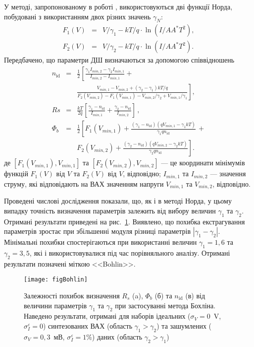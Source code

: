 У методі, запропонованому в роботі \cite{Bohlin}, використовуються дві функції Норда, побудовані з використанням двох різних значень $\gamma_N$:
\begin{eqnarray}
\label{eqBohlin}
F_1(V)&=&V/\gamma_1-kT/q\cdot\ln(I/AA^*T^2),
\nonumber\\
F_2(V)&=&V/\gamma_2-kT/q\cdot\ln(I/AA^*T^2).
\end{eqnarray}
Передбачено, що параметри ДШ визначаються за допомогою співвідношень
\begin{eqnarray}
\label{eqBohlinDet}
n_\mathrm{id}&=&\frac{1}{2}\left[\frac{\gamma_1I_{min,2}-\gamma_2I_{min,1}}{I_{min,2}-I_{min,1}}+\right.
\\
&&\left.\frac{V_{min,1}-V_{min,2}+(\gamma_2-\gamma_1)kT/q}{F_2(V_{min,2})-F_1(V_{min,1})-V_{min,2}/\gamma_2+V_{min,1}/\gamma_1}\right]
,\nonumber
\\
Rs&=&\frac{kT}{2q}\left[\frac{\gamma_1-n_\mathrm{id}}{I_{min,1}}+\frac{\gamma_2-n_\mathrm{id}}{I_{min,2}}\right]\,,
\\
\Phi_b&=&\frac{1}{2}\left[F_1(V_{min,1})+\frac{(\gamma_1-n_\mathrm{id})(qV_{min,1}-\gamma_1kT)}{\gamma_1qn_\mathrm{id}}\,+\right.
\nonumber\\
&&\left.F_2(V_{min,2})+\frac{(\gamma_2-n_\mathrm{id})(qV_{min,2}-\gamma_2kT)}{\gamma_2qn_\mathrm{id}}\right].
\end{eqnarray}
де
$[F_1(V_{min,1}), V_{min,1}]$ та $[F_2(V_{min,2}), V_{min,2}]$ --- це координати мінімумів функцій  $F_1(V)$ від $V$ та $F_2(V)$ від $V$, відповідно;
$I_{min,1}$ та $I_{min,2}$ --- значення струму, які відповідають на ВАХ значенням напруги $V_{min,1}$ та $V_{min,2}$, відповідно.

Проведені числові дослідження показали, що, як і в методі Норда, у цьому випадку точність визначення параметрів залежить від вибору величин $\gamma_1$ та $\gamma_2$.
Отримані результати приведені на рис.~\ref{figBohlin}.
Виявлено, що похибка екстрагування параметрів зростає при збільшенні модуля різниці параметрів $|\gamma_1-\gamma_2|$.
Мінімальні похибки спостерігаються при використанні величин $\gamma_1=1,6$ та $\gamma_2=3,5$, які і використовувалися під час порівняльного аналізу.
Отримані результати позначені міткою <<Bohlin>>.

\begin{figure}
\center
\texttt{[image: figBohlin]}%
\caption{\label{figBohlin}
Залежності похибок визначення $R_s$ (a), $\Phi_b$ (б) та $n_\mathrm{id}$ (в) від величини параметрів $\gamma_1$ та $\gamma_2$ при застосуванні метода Бохліна.
Наведено результати, отримані для наборів ідеальних ($\sigma_V=0$~V, $\sigma_I^\varepsilon=0$) синтезованих ВАХ (область $\gamma_1>\gamma_2$) та зашумлених ($\sigma_V=0,3$~мВ, $\sigma_I^\varepsilon=1\%$) даних (область $\gamma_2>\gamma_1$)
}
\end{figure}

